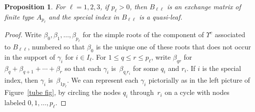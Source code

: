 \documentclass{amsart}
\newtheorem{proposition}{Proposition}[section]
\theoremstyle{definition}
\theoremstyle{remark}
\numberwithin{equation}{section}
\newcommand{\0}{{\mathbf{0}}}
\newcommand{\RSTChar}{\Upsilon}
\newcommand{\RST}[1]{\RSTChar^{#1}}
\begin{document}
\begin{proposition}\label{A and q-l}
  For $\ell=1,2,3$, if $p_\ell>0$, then $B_{\ell\ell}$ is an exchange matrix of finite type $A_{p_\ell}$ and the special index in $B_{\ell\ell}$ is a quasi-leaf.
\end{proposition}
\begin{proof}
Write $\beta_0,\beta_1,\ldots,\beta_{p_\ell}$ for the simple roots of the component of $\RST{c}$ associated to $B_{\ell\ell}$, numbered so that $\beta_0$ is the unique one of these roots that does not occur in the support of $\gamma_i$ for $i\in I_\ell$.
For $1\le q\le r\le p_\ell$, write $\beta_{qr}$ for $\beta_q+\beta_{q+1}+\cdots+\beta_{r}$ so that each $\gamma_i$ is~$\beta_{q_ir_i}$ for some $q_i$ and $r_i$.
If $i$ is the special index, then $\gamma_i$ is~$\beta_{1p_\ell}$.
We can represent each $\gamma_i$ pictorially as in the left picture of Figure~\ref{tube fig}, by circling the nodes $q_i$ through~$r_i$ on a cycle with nodes labeled $0,1,\ldots,p_\ell$.


\end{proof}
\end{document}
